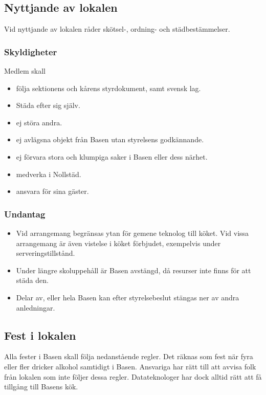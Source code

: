 \documentclass[a4paper]{dtek}
\begin{document}
\subsection{Nyttjande av lokalen}
Vid nyttjande av lokalen råder skötsel-, ordning- och städbestämmelser.

\subsubsection{Skyldigheter}
Medlem skall
\begin{itemize}
    \item följa sektionens och kårens styrdokument, samt svensk lag.
    \item Städa efter sig själv.
    \item ej störa andra.
    \item ej avlägsna objekt från Basen utan styrelsens godkännande.
    \item ej förvara stora och klumpiga saker i Basen eller dess närhet.
    \item medverka i Nollstäd.
    \item ansvara för sina gäster.
\end{itemize}

\subsubsection{Undantag}
\begin{itemize}
    \item Vid arrangemang begränsas ytan för gemene teknolog till köket. Vid vissa arrangemang är även vistelse i köket förbjudet, exempelvis under serveringstillstånd.
    \item Under längre skoluppehåll är Basen avstängd, då resurser inte finns för att städa den.
    \item Delar av, eller hela Basen kan efter styrelsebeslut stängas ner av andra anledningar.
\end{itemize}

\subsection{Fest i lokalen}
Alla fester i Basen skall följa nedanstående regler. Det räknas som fest när fyra eller fler dricker alkohol samtidigt i Basen. Ansvariga har rätt till att avvisa folk från lokalen som inte följer dessa regler. Datateknologer har dock alltid rätt att få tillgång till Basens kök.
\end{document}
